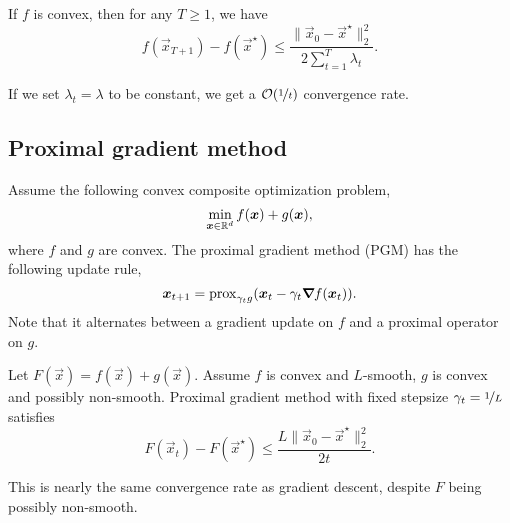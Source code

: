 \begin{theorem}
    If $f$ is convex, then for any $T \geq 1$, we have \[
        f(\vec{x}_{T+1}) - f(\vec{x}^\star) \leq \frac{\| \vec{x}_0 - \vec{x}^\star \|_2^2}{2 \sum_{t=1}^{T} \lambda_t}.
    \]
\end{theorem}
If we set $\lambda_t = \lambda$ to be constant, we get a $\bigo{\nicefrac{1}{t}}$ convergence rate.

\subsection{Proximal gradient method}

Assume the following convex composite optimization problem, \[
    \min_{\bm{x} \in \mathbb{R}^d} f(\bm{x}) + g(\bm{x}),
\]
where $f$ and $g$ are convex. The proximal
gradient method (PGM) has the following update rule, \[
    \bm{x}_{t+1} = \mathrm{prox}_{\gamma_t g}(\bm{x}_t - \gamma_t \bm{\nabla}_{\! } f(\bm{x}_t)).
\]
Note that it alternates between a gradient update on $f$ and a proximal operator on $g$.

\begin{theorem}
    Let $F(\vec{x}) = f(\vec{x}) + g(\vec{x})$. Assume $f$ is convex and $L$-smooth, $g$ is convex
    and possibly non-smooth. Proximal gradient method with fixed stepsize $\gamma_t = \nicefrac{1}{L}$
    satisfies \[
        F(\vec{x}_t) - F(\vec{x}^\star) \leq \frac{L \| \vec{x}_0 - \vec{x}^\star \|_2^2}{2t}.
    \]
\end{theorem}
This is nearly the same convergence rate as gradient descent, despite $F$ being possibly non-smooth.
